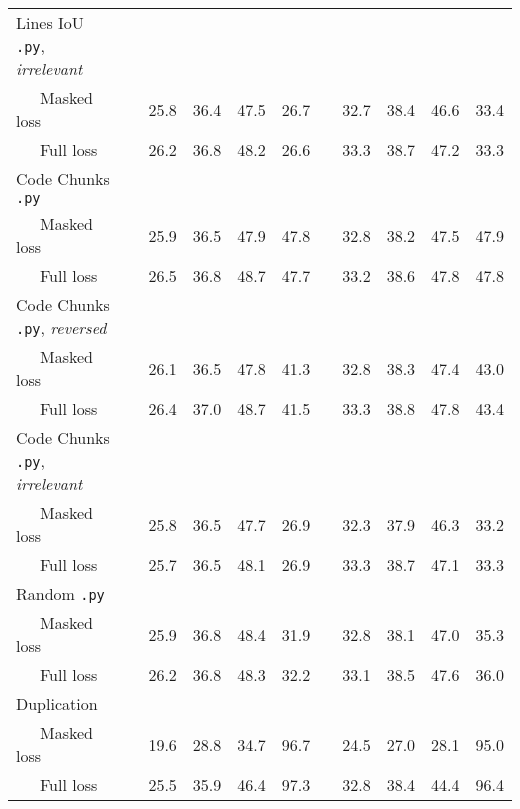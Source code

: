 \documentclass{standalone}
\begin{document}
\begin{table}[h]
\begin{tabular}{lc cccc c cccc}
    \midrule
    Lines IoU \texttt{.py}, \textit{irrelevant} & & & & & & & & & & \\
    ~~~Masked loss & & 25.8 & 36.4 & 47.5 & 26.7 & & 32.7 & 38.4 & 46.6 & 33.4 \\
    ~~~Full loss & & 26.2 & 36.8 & 48.2 & 26.6 & & 33.3 & 38.7 & 47.2 & 33.3 \\
    
    \midrule
    Code Chunks \texttt{.py} & & & & & & & & & & \\
    ~~~Masked loss & & 25.9 & 36.5 & 47.9 & 47.8 & & 32.8 & 38.2 & 47.5 & 47.9 \\
    ~~~Full loss & & 26.5 & 36.8 & 48.7 & 47.7 & & 33.2 & 38.6 & 47.8 & 47.8 \\
    
    \midrule
    Code Chunks \texttt{.py}, \textit{reversed} & & & & & & & & & & \\
    ~~~Masked loss & & 26.1 & 36.5 & 47.8 & 41.3 & & 32.8 & 38.3 & 47.4 & 43.0 \\
    ~~~Full loss & & 26.4 & 37.0 & 48.7 & 41.5 & & 33.3 & 38.8 & 47.8 & 43.4 \\
    
    \midrule
    Code Chunks \texttt{.py}, \textit{irrelevant} & & & & & & & & & & \\
    ~~~Masked loss & & 25.8 & 36.5 & 47.7 & 26.9 & & 32.3 & 37.9 & 46.3 & 33.2 \\
    ~~~Full loss & & 25.7 & 36.5 & 48.1 & 26.9 & & 33.3 & 38.7 & 47.1 & 33.3 \\
    
    \midrule
    Random \texttt{.py} & & & & & & & & & & \\
    ~~~Masked loss & & 25.9 & 36.8 & 48.4 & 31.9 & & 32.8 & 38.1 & 47.0 & 35.3 \\
    ~~~Full loss & & 26.2 & 36.8 & 48.3 & 32.2 & & 33.1 & 38.5 & 47.6 & 36.0 \\
    
    \midrule
    Duplication & & & & & & & & & & \\
    ~~~Masked loss & & 19.6 & 28.8 & 34.7 & 96.7 & & 24.5 & 27.0 & 28.1 & 95.0 \\
    ~~~Full loss & & 25.5 & 35.9 & 46.4 & 97.3 & & 32.8 & 38.4 & 44.4 & 96.4 \\
    
    \bottomrule
    \end{tabular}
\end{table}
\end{document}
